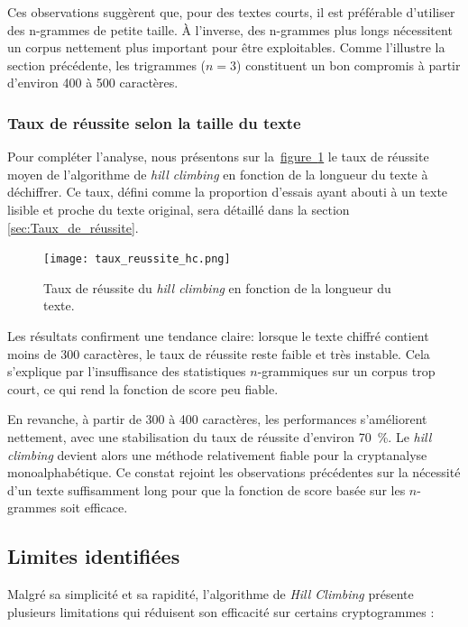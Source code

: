 \documentclass[a4paper]{article}
\newcommand{\figref}[1]{\hyperref[#1]{figure~\ref*{#1}}}
\begin{document}
Ces observations suggèrent que, pour des textes courts, il est préférable d’utiliser des n-grammes de petite taille. À l’inverse, des n-grammes plus longs nécessitent un corpus nettement plus important pour être exploitables. Comme l’illustre la section précédente, les trigrammes ($n=3$) constituent un bon compromis à partir d’environ 400 à 500 caractères.

\subsubsection{Taux de réussite selon la taille du texte}

Pour compléter l’analyse, nous présentons sur la~\figref{fig:taux_reussite} le taux de réussite moyen de l’algorithme de \textit{hill climbing} en fonction de la longueur du texte à déchiffrer. Ce taux, défini comme la proportion d’essais ayant abouti à un texte lisible et proche du texte original, sera détaillé dans la section \ref{sec:Taux_de_réussite}.

\begin{figure}[H]
\centering
\texttt{[image: taux\_reussite\_hc.png]}
\caption{Taux de réussite du \textit{hill climbing} en fonction de la longueur du texte.}
\label{fig:taux_reussite}
\end{figure}


Les résultats confirment une tendance claire: lorsque le texte chiffré contient moins de 300 caractères, le taux de réussite reste faible et très instable. Cela s'explique par l’insuffisance des statistiques $n$-grammiques sur un corpus trop court, ce qui rend la fonction de score peu fiable.

En revanche, à partir de 300 à 400 caractères, les performances s'améliorent nettement, avec une stabilisation du taux de réussite d'environ 70~\%. Le \textit{hill climbing} devient alors une méthode relativement fiable pour la cryptanalyse monoalphabétique. Ce constat rejoint les observations précédentes sur la nécessité d’un texte suffisamment long pour que la fonction de score basée sur les $n$-grammes soit efficace.



\subsection{Limites identifiées}

Malgré sa simplicité et sa rapidité, l’algorithme de \textit{Hill Climbing} présente plusieurs limitations qui réduisent son efficacité sur certains cryptogrammes :
\end{document}
